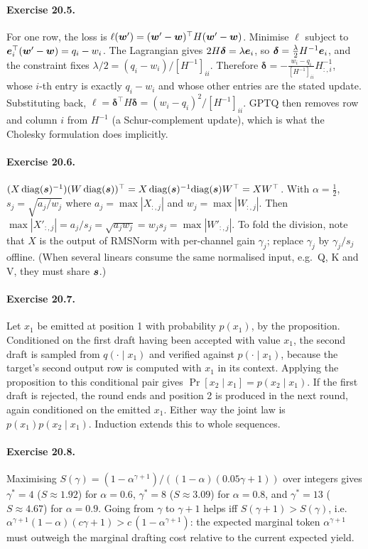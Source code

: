 \paragraph{Exercise 20.5.} For one row, the loss is
$\ell(\bm{w}')=(\bm{w}'-\bm{w})^\top H(\bm{w}'-\bm{w})$. Minimise $\ell$ subject to
$\bm{e}_i^\top(\bm{w}'-\bm{w})=q_i-w_i$. The Lagrangian gives
$2H\boldsymbol\delta=\lambda\bm{e}_i$, so $\boldsymbol\delta=\frac{\lambda}{2}H^{-1}\bm{e}_i$,
and the constraint fixes $\lambda/2=(q_i-w_i)/[H^{-1}]_{ii}$. Therefore
$\boldsymbol\delta=-\frac{w_i-q_i}{[H^{-1}]_{ii}}H^{-1}_{:,i}$, whose $i$-th entry is
exactly $q_i-w_i$ and whose other entries are the stated update. Substituting back,
$\ell=\boldsymbol\delta^\top H\boldsymbol\delta=(w_i-q_i)^2/[H^{-1}]_{ii}$. GPTQ then
removes row and column $i$ from $H^{-1}$ (a Schur-complement update), which is what the
Cholesky formulation does implicitly.

\paragraph{Exercise 20.6.}
$(X\,\mathrm{diag}(\bm{s})^{-1})(W\,\mathrm{diag}(\bm{s}))^\top
=X\,\mathrm{diag}(\bm{s})^{-1}\mathrm{diag}(\bm{s})W^\top=XW^\top$.
With $\alpha=\tfrac12$, $s_j=\sqrt{a_j/w_j}$ where $a_j=\max|X_{:,j}|$ and
$w_j=\max|W_{:,j}|$. Then $\max|X'_{:,j}|=a_j/s_j=\sqrt{a_jw_j}=w_js_j=\max|W'_{:,j}|$.
To fold the division, note that $X$ is the output of RMSNorm with per-channel gain
$\gamma_j$; replace $\gamma_j$ by $\gamma_j/s_j$ offline. (When several linears consume
the same normalised input, e.g.\ Q, K and V, they must share $\bm{s}$.)

\paragraph{Exercise 20.7.} Let $x_1$ be emitted at position 1 with probability $p(x_1)$,
by the proposition. Conditioned on the first draft having been accepted with value $x_1$,
the second draft is sampled from $q(\cdot\mid x_1)$ and verified against
$p(\cdot\mid x_1)$, because the target's second output row is computed with $x_1$ in its
context. Applying the proposition to this conditional pair gives
$\Pr[x_2\mid x_1]=p(x_2\mid x_1)$. If the first draft is rejected, the round ends and
position 2 is produced in the next round, again conditioned on the emitted $x_1$.
Either way the joint law is $p(x_1)p(x_2\mid x_1)$. Induction extends this to whole
sequences.

\paragraph{Exercise 20.8.} Maximising
$S(\gamma)=(1-\alpha^{\gamma+1})/((1-\alpha)(0.05\gamma+1))$ over integers gives
$\gamma^{*}=4$ ($S\approx1.92$) for $\alpha=0.6$, $\gamma^{*}=8$ ($S\approx3.09$) for
$\alpha=0.8$, and $\gamma^{*}=13$ ($S\approx4.67$) for $\alpha=0.9$. Going from $\gamma$
to $\gamma+1$ helps iff
$S(\gamma+1)>S(\gamma)$, i.e.\
$\alpha^{\gamma+1}(1-\alpha)(c\gamma+1)>c\,(1-\alpha^{\gamma+1})$: the expected marginal
token $\alpha^{\gamma+1}$ must outweigh the marginal drafting cost relative to the
current expected yield.

